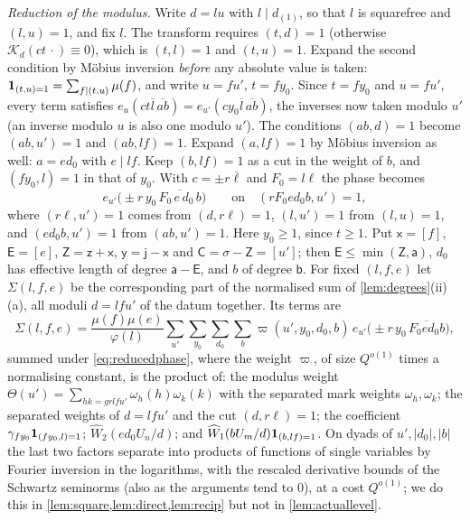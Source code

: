 \documentclass[11pt,colorlinks]{charlie}
\begin{document}
\emph{Reduction of the modulus.} Write $d=lu$ with $l\mid d_{(1)}$, so that $l$ is squarefree and $(l,u)=1$, and fix $l$. The transform requires $(t,d)=1$ (otherwise $\mathscr K_d(ct\,\cdot)\equiv0$), which is $(t,l)=1$ and $(t,u)=1$. Expand the second condition by M\"obius inversion \emph{before} any absolute value is taken: $\mathbf{1}_{(t,u)=1}=\sum_{f\mid(t,u)}\mu(f)$, and write $u=fu'$, $t=fy_0$. Since $t=fy_0$ and $u=fu'$, every term satisfies $e_u(ct\overline l\,\overline{ab})=e_{u'}(cy_0\overline l\,\overline{ab})$, the inverses now taken modulo $u'$ (an inverse modulo $u$ is also one modulo $u'$). The conditions $(ab,d)=1$ become $(ab,u')=1$ and $(ab,lf)=1$. Expand $(a,lf)=1$ by M\"obius inversion as well: $a=ed_0$ with $e\mid lf$. Keep $(b,lf)=1$ as a cut in the weight of $b$, and $(fy_0,l)=1$ in that of $y_0$. With $c=\pm r\overline\ell$ and $F_0=l\ell$ the phase becomes
\begin{equation}\label{eq:reducedphase}
 e_{u'}\big(\pm r\,y_0\,\overline{F_0\,e\,d_0\,b}\big)\qquad\text{on}\quad(rF_0ed_0b,u')=1,
\end{equation}
where $(r\ell,u')=1$ comes from $(d,r\ell)=1$, $(l,u')=1$ from $(l,u)=1$, and $(ed_0b,u')=1$ from $(ab,u')=1$. Here $y_0\ge1$, since $t\ge1$. Put $\mathsf x=[f]$, $\mathsf E=[e]$, $\mathsf Z=\mathsf z+\mathsf x$, $\mathsf y=\mathsf j-\mathsf x$ and $\mathsf C=\sigma-\mathsf Z=[u']$; then $\mathsf E\le\min(\mathsf Z,\mathsf a)$, $d_0$ has effective length of degree $\mathsf a-\mathsf E$, and $b$ of degree $\mathsf b$. For fixed $(l,f,e)$ let $\Sigma(l,f,e)$ be the corresponding part of the normalised sum of \cref{lem:degrees}(ii)(a), all moduli $d=lfu'$ of the datum together. Its terms are
\begin{equation}\label{eq:reducedsum}
 \Sigma(l,f,e)=\frac{\mu(f)\mu(e)}{\varphi(l)}\sum_{u'}\sum_{y_0}\sum_{d_0}\sum_b\varpi(u',y_0,d_0,b)\,e_{u'}\big(\pm r\,y_0\,\overline{F_0ed_0b}\big),
\end{equation}
summed under \eqref{eq:reducedphase}, where the weight $\varpi$, of size $Q^{o(1)}$ times a normalising constant, is the product of: the modulus weight $\Theta(u')=\sum_{hk=grlfu'}\omega_h(h)\omega_k(k)$ with the separated mark weights $\omega_h,\omega_k$; the separated weights of $d=lfu'$ and the cut $(d,r\ell)=1$; the coefficient $\gamma_{fy_0}\mathbf{1}_{(fy_0,l)=1}$; $\widehat W_2(ed_0U_n/d)$; and $\widehat W_1(bU_m/d)\mathbf{1}_{(b,lf)=1}$. On dyads of $u',|d_0|,|b|$ the last two factors separate into products of functions of single variables by Fourier inversion in the logarithms, with the rescaled derivative bounds of the Schwartz seminorms (also as the arguments tend to $0$), at a cost $Q^{o(1)}$; we do this in \cref{lem:square,lem:direct,lem:recip} but not in \cref{lem:actuallevel}.
\end{document}

